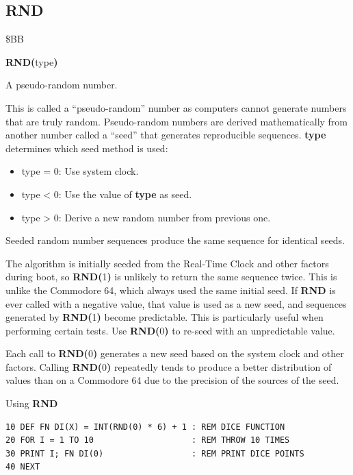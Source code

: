
\newpage
\subsection{RND}
\begin{description}[leftmargin=2cm,style=nextline]
\item [Token:]    \$BB

\item [Format:]   {\bf RND(}type{\bf)}

\item [Returns:]  A pseudo-random number.

                  This is called a ``pseudo-random'' number as computers cannot generate numbers that are truly random. Pseudo-random numbers are derived mathematically from another number called a ``seed'' that generates reproducible sequences. {\bf type} determines which seed method is used:

                  \begin{itemize}
                     \item type = 0: Use system clock.
                     \item type < 0: Use the value of {\bf type} as seed.
                     \item type > 0: Derive a new random number from previous one.
                  \end{itemize}

\item [Remarks:]  Seeded random number sequences produce the same sequence for identical seeds.

                  The algorithm is initially seeded from the Real-Time Clock and other factors during boot, so {\bf RND(}1{\bf)} is unlikely to return the same sequence twice. This is unlike the Commodore 64, which always used the same initial seed. If {\bf RND} is ever called with a negative value, that value is used as a new seed, and sequences generated by {\bf RND(}1{\bf)} become predictable. This is particularly useful when performing certain tests. Use {\bf RND(}0{\bf)} to re-seed with an unpredictable value.

                  Each call to {\bf RND(}0{\bf)} generates a new seed based on the system clock and other factors. Calling {\bf RND(}0{\bf)} repeatedly tends to produce a better distribution of values than on a Commodore 64 due to the precision of the sources of the seed.

\item [Example:]  Using {\bf RND}

\begin{tcolorbox}[colback=black,coltext=white]
\verbatimfont{\codefont}
\begin{verbatim}
10 DEF FN DI(X) = INT(RND(0) * 6) + 1 : REM DICE FUNCTION
20 FOR I = 1 TO 10                    : REM THROW 10 TIMES
30 PRINT I; FN DI(0)                  : REM PRINT DICE POINTS
40 NEXT
\end{verbatim}
\end{tcolorbox}
\end{description}

